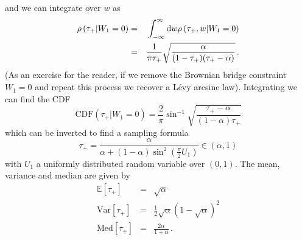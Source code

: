\documentclass{article}
\newcommand{\tp}{{\tau_{\mathrm{+}}}}
\newcommand{\Var}{\mathrm{Var}}
\newcommand{\Med}{\mathrm{Med}}
\begin{document}
and we can integrate over $w$ as
\begin{eqnarray}
  \rho\left(\tp | W_1=0\right) &=& \int_{-\infty}^\infty {\textrm d}w   \rho\left(\tp,w | W_1=0\right) \\
&=&    \frac{1}{\pi \tp}\sqrt{\frac{\alpha}{(1-\tp)(\tp-\alpha)}} \label{eq:tp} \,.
\end{eqnarray}
(As an exercise for the reader, if we remove the Brownian bridge constraint $W_1=0$ and repeat this process we recover a L\'evy arcsine law).
Integrating we can find the CDF
\begin{equation}
\textrm{CDF}\left(\tp | W_1=0 \right) = \frac{2}{\pi}\sin^{-1}\sqrt{\frac{\tp-\alpha}{(1-\alpha)\tp}}
\end{equation}
which can be inverted to find a sampling formula
\begin{equation}\label{eq:tp_sample}
\tp = \frac{\alpha}{\alpha + (1-\alpha) \sin^2 \left( \frac{\pi}{2} U_1 \right)} \in \left(\alpha,1\right)
\end{equation}
with $U_1$ a uniformly distributed random variable over $(0,1)$. The mean, variance and median are given by
\begin{eqnarray}
\mathbb{E}\left[\tp\right] &=& \sqrt{\alpha} \\
\Var\left[\tp\right] &=& \frac{1}{2}\sqrt{\alpha}\left(1-\sqrt{\alpha}\right)^2  \\
\Med\left[\tp\right] &=& \frac{2\alpha}{1+\alpha}  \, .
\end{eqnarray}
\end{document}
